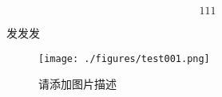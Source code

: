 
\begin{equation}
111
\end{equation}

发发发
\begin{figure}[ht]
\centering
\texttt{[image: ./figures/test001.png]}
\caption{请添加图片描述} \label{test00_fig1}
\end{figure}